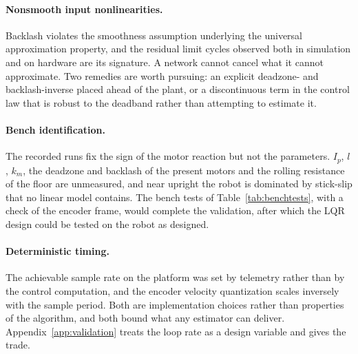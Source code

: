 \paragraph{Nonsmooth input nonlinearities.} Backlash violates the smoothness
assumption underlying the universal approximation property, and the residual
limit cycles observed both in simulation and on hardware are its signature. A
network cannot cancel what it cannot approximate. Two remedies are worth
pursuing: an explicit deadzone- and backlash-inverse placed ahead of the plant,
or a discontinuous term in the control law that is robust to the deadband rather
than attempting to estimate it.

\paragraph{Bench identification.} The recorded runs fix the sign of the
motor reaction but not the parameters. $I_p$, $l$, $k_m$, the deadzone and
backlash of the present motors and the rolling resistance of the floor are
unmeasured, and near upright the robot is dominated by stick-slip that no
linear model contains. The bench tests of Table~\ref{tab:benchtests}, with a
check of the encoder frame, would complete the validation, after which the LQR
design could be tested on the robot as designed.

\paragraph{Deterministic timing.} The achievable sample rate on the
platform was set by telemetry rather than by the control computation, and the
encoder velocity quantization scales inversely with the sample period. Both are
implementation choices rather than properties of the algorithm, and both bound
what any estimator can deliver. Appendix~\ref{app:validation} treats the loop
rate as a design variable and gives the trade.
